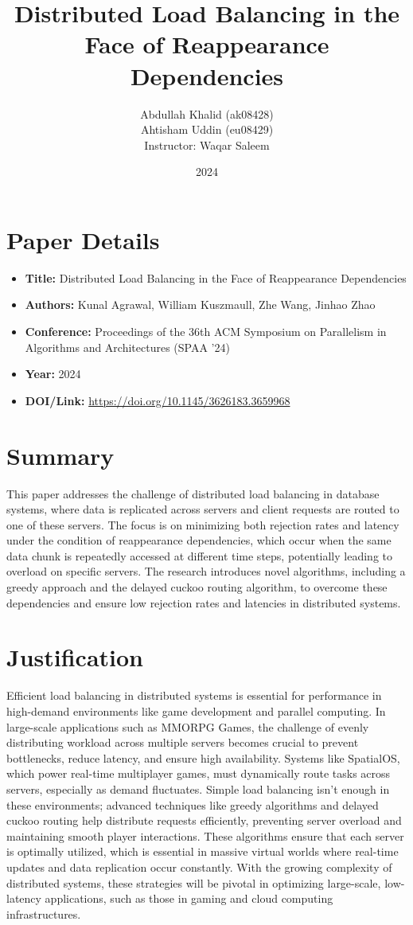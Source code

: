 \documentclass[12pt]{article}
\title{Distributed Load Balancing in the Face of Reappearance Dependencies}
\author{
    Abdullah Khalid (ak08428)\\
    Ahtisham Uddin (eu08429)\\
    Instructor: Waqar Saleem
}
\date{2024}
\begin{document}
\maketitle

\section*{Paper Details}
\begin{itemize}
    \item \textbf{Title:} Distributed Load Balancing in the Face of Reappearance Dependencies
    \item \textbf{Authors:} Kunal Agrawal, William Kuszmaull, Zhe Wang, Jinhao Zhao
    \item \textbf{Conference:} Proceedings of the 36th ACM Symposium on Parallelism in Algorithms and Architectures (SPAA '24)
    \item \textbf{Year:} 2024
    \item \textbf{DOI/Link:} \url{https://doi.org/10.1145/3626183.3659968}
\end{itemize}

\section*{Summary}
This paper addresses the challenge of distributed load balancing in database systems, where data is replicated across servers and client requests are routed to one of these servers. The focus is on minimizing both rejection
 rates and latency under the condition of reappearance dependencies, which occur when the same data chunk is repeatedly accessed at different time steps, potentially leading to overload on specific servers. The research
  introduces novel algorithms, including a greedy approach and the delayed cuckoo routing algorithm, to overcome these dependencies and ensure low rejection rates and latencies in distributed systems.

\section*{Justification}
Efficient load balancing in distributed systems is essential for performance in high-demand environments like game development and parallel computing. In large-scale applications such as MMORPG Games, 
the challenge of evenly distributing workload across multiple servers becomes crucial to prevent bottlenecks, reduce latency, and ensure high availability. Systems like SpatialOS, which power real-time multiplayer games,
 must dynamically route tasks across servers, especially as demand fluctuates. Simple load balancing isn't enough in these environments; advanced techniques like greedy algorithms and delayed cuckoo routing help distribute 
 requests efficiently, preventing server overload and maintaining smooth player interactions. These algorithms ensure that each server is optimally utilized, which is essential in massive virtual worlds where real-time 
 updates and data replication occur constantly. With the growing complexity of distributed systems, these strategies will be pivotal in optimizing large-scale, low-latency applications, such as those in gaming and cloud
computing infrastructures.
\end{document}
